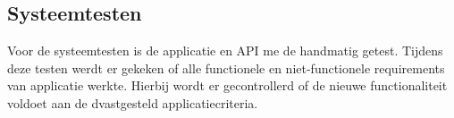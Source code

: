 \subsection{Systeemtesten}
Voor de systeemtesten is de applicatie en API me de handmatig getest.
Tijdens deze testen werdt er gekeken of alle functionele en niet-functionele requirements van applicatie werkte.
Hierbij wordt er gecontrollerd of de nieuwe functionaliteit voldoet aan de dvastgesteld applicatiecriteria.

